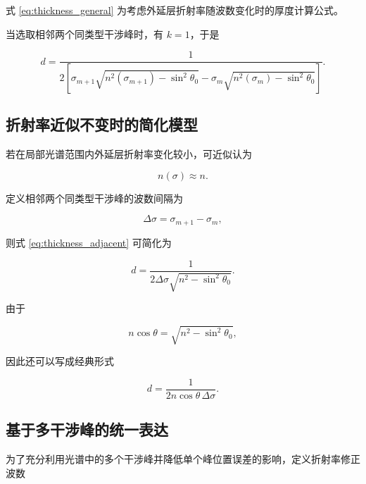 \documentclass[UTF8,12pt,a4paper]{ctexart}
\begin{document}
式 \eqref{eq:thickness_general} 为考虑外延层折射率随波数变化时的厚度计算公式。

当选取相邻两个同类型干涉峰时，有 $k=1$，于是

\begin{equation}
    \boxed{
    d
    =
    \frac{1}{
    2\left[
    \sigma_{m+1}
    \sqrt{
    n^2(\sigma_{m+1})-\sin^2\theta_0
    }
    -
    \sigma_m
    \sqrt{
    n^2(\sigma_m)-\sin^2\theta_0
    }
    \right]
    }
    }.
    \label{eq:thickness_adjacent}
\end{equation}

\subsection{折射率近似不变时的简化模型}

若在局部光谱范围内外延层折射率变化较小，可近似认为

\begin{equation}
    n(\sigma)\approx n.
\end{equation}

定义相邻两个同类型干涉峰的波数间隔为

\begin{equation}
    \Delta\sigma
    =
    \sigma_{m+1}-\sigma_m,
\end{equation}

则式 \eqref{eq:thickness_adjacent} 可简化为

\begin{equation}
    \boxed{
    d
    =
    \frac{1}{
    2\Delta\sigma
    \sqrt{
    n^2-\sin^2\theta_0
    }
    }
    }.
    \label{eq:thickness_constant_n}
\end{equation}

由于

\begin{equation}
    n\cos\theta
    =
    \sqrt{n^2-\sin^2\theta_0},
\end{equation}

因此还可以写成经典形式

\begin{equation}
    \boxed{
    d
    =
    \frac{1}{
    2n\cos\theta\,\Delta\sigma
    }
    }.
\end{equation}

\subsection{基于多干涉峰的统一表达}

为了充分利用光谱中的多个干涉峰并降低单个峰位置误差的影响，定义折射率修正波数
\end{document}

